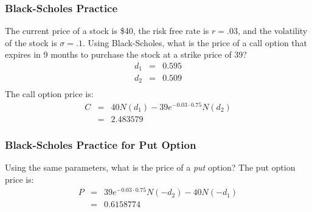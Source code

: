 \documentclass{beamer}
\begin{document}
\begin{frame}
\frametitle{Black-Scholes Practice}
The current price of a stock is \$40,  the risk free rate is \(r = .03\), and the volatility of the stock is \(\sigma = .1\). Using Black-Scholes, what is the price of a call option that expires in 9 months to purchase the stock at a strike price of 39?
\begin{eqnarray*}
d_1 &=& 0.595 \\
d_2 &=& 0.509\\
\end{eqnarray*}
\pause
The call option price is:
\begin{eqnarray*}
C &=& 40 N(d_1) - 39 e^{-0.03 \cdot 0.75} N(d_2) \\
&=& 2.483579
\end{eqnarray*}
\end{frame}

\begin{frame}
\frametitle{Black-Scholes Practice for Put Option}
Using the same parameters, what is the price of a \emph{put} option?
\pause
The put option price is:
\begin{eqnarray*}
P &=& 39 e^{-0.03 \cdot 0.75} N(-d_2) - 40 N(-d_1) \\
&=& 0.6158774
\end{eqnarray*}
\end{frame}
\end{document}
